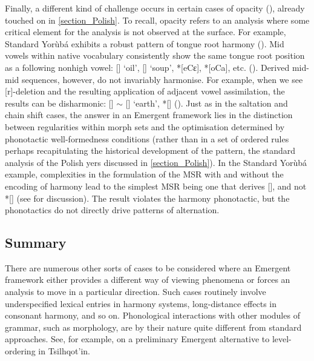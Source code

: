 Finally, a different kind of challenge occurs in certain cases of opacity (\citealt{McCarthy:1999, McCarthy:2007_hidden, Idsardi:2000}), already touched on in \Sec\ref{section_Polish}. To recall, opacity refers to an analysis where some critical element for the analysis is not observed at the surface. For example, Standard Yorùbá exhibits a robust pattern of tongue root harmony (\citealt{Bamgbose:1967, Awobuluyi:1967, Archangeli+:1989}). Mid vowels within native vocabulary consistently show the same tongue root position as a following nonhigh vowel: [] `oil', [] `soup', *[eCɛ], *[oCa], etc. (\citealt[177]{Archangeli+:1989}). Derived mid-mid sequences, however, do not invariably harmonise. For example, when we see [r]-deletion and the resulting application of adjacent vowel assimilation, the results can be disharmonic: [] $\sim$ [] `earth', *[] (\citealt[187]{Archangeli+:1989}). Just as in the saltation and chain shift cases, the answer in an Emergent framework lies in the distinction between regularities within morph sets and the optimisation determined by phonotactic well-formedness conditions (rather than in a set of ordered rules perhaps recapitulating the historical development of the pattern, the standard analysis of the Polish yers discussed in \textsection\ref{section_Polish}). In the Standard Yorùbá  example, complexities in the formulation of the MSR with and without the encoding of harmony lead to the simplest MSR being one that derives [], and not *[] (see \citealt{Archangeli+:2015_YVH} for discussion). The result violates the harmony phonotactic, but the phonotactics do not directly drive patterns of alternation.




\subsection{Summary}

There are numerous other sorts of cases to be considered where an Emergent framework either provides a different way of viewing phenomena or forces an analysis to move in a particular direction. Such cases  routinely involve underspecified lexical entries in harmony systems, long-distance effects in consonant harmony, and so on. Phonological interactions with other modules of grammar, such as morphology, are by their nature quite different from standard approaches. See, for example, \citet{Kwak:2020} on a preliminary Emergent alternative to level-ordering in Tsilhqot'in. 

